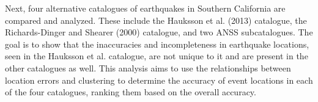 \documentclass[12pt]{article} %
\theoremstyle{plain}
\begin{document}
	Next, four alternative catalogues of earthquakes in Southern California are compared and analyzed. These include the Hauksson et al. (2013) catalogue, the Richards-Dinger and Shearer (2000) catalogue, and two ANSS subcatalogues. The goal is to show that the inaccuracies and incompleteness in earthquake locations, seen in the Hauksson et al. catalogue, are not unique to it and are present in the other catalogues as well. This analysis aims to use the relationships between location errors and clustering to determine the accuracy of event locations in each of the four catalogues, ranking them based on the overall accuracy.
	


	
\end{document}
